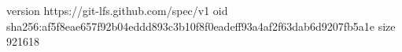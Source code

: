 version https://git-lfs.github.com/spec/v1
oid sha256:af5f8eae657f92b04eddd893c3b10f8f0eadeff93a4af2f63dab6d9207fb5a1e
size 921618
